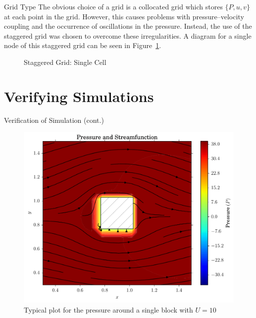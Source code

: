 \documentclass[pdf]{beamer}
\begin{document}
\begin{frame}{Grid Type}
The obvious choice of a grid is a collocated grid which stores $\{ P, u, v\}$ at each point in the grid. However, this causes problems with pressure--velocity coupling and the occurrence of oscillations in the pressure. Instead, the use of the staggered grid was chosen to overcome these irregularities. A diagram for a single node of this staggered grid can be seen in Figure~\ref{fig:stagg_1}.
\vspace{-1em}
\begin{figure}[H]
\centering
{}
\caption{Staggered Grid: Single Cell}
\label{fig:stagg_1}
\end{figure}
\end{frame}

\section{Verifying Simulations}

\begin{frame}{Verification of Simulation (cont.)}
\begin{figure}[h]
\centering
\includegraphics[width=.6\textwidth]{figs/pressure_single.pdf}
\caption{Typical plot for the pressure around a single block with $U=10$}
\end{figure}
\end{frame}
\end{document}
